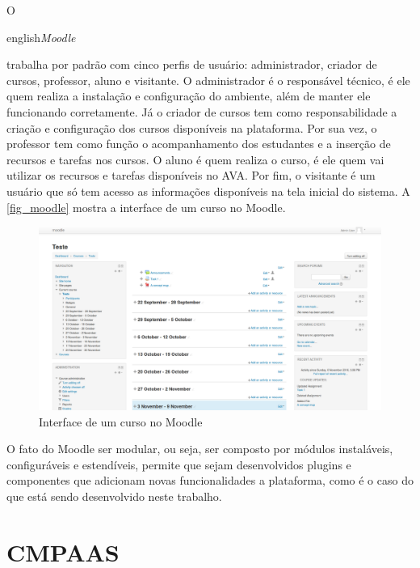 \documentclass[
	12pt,				%
	openright,			%
	oneside,			%
	a4paper,			%
	english,			%
	french,				%
	spanish,			%
	brazil				%
	]{abntex2}
\begin{document}
O \begin{otherlanguage*}{english}\textit{Moodle}\end{otherlanguage*} trabalha por padrão com cinco perfis de usuário: administrador, criador de cursos, professor, aluno e visitante. O administrador é o responsável técnico, é ele quem realiza a instalação e configuração do ambiente, além de manter ele funcionando corretamente. Já o criador de cursos tem como responsabilidade a criação e configuração dos cursos disponíveis na plataforma. Por sua vez, o professor tem como função o acompanhamento dos estudantes e a inserção de recursos e tarefas nos cursos. O aluno é quem realiza o curso, é ele quem vai utilizar os recursos e tarefas disponíveis no AVA. Por fim, o visitante é um usuário que só tem acesso as informações disponíveis na tela inicial do sistema. A \autoref{fig_moodle} mostra a interface de um curso no Moodle.


\begin{figure}[htb]
	\caption{\label{fig_moodle}Interface de um curso no Moodle}
	\begin{center}
		\includegraphics[scale=0.2]{moodle.png}
	\end{center}
\end{figure}
O fato do Moodle ser modular, ou seja, ser composto por módulos instaláveis, configuráveis e estendíveis,  permite que sejam desenvolvidos plugins e componentes que adicionam novas funcionalidades a plataforma, como é o caso do que está sendo desenvolvido neste trabalho.




\chapter{CMPAAS}
\end{document}
